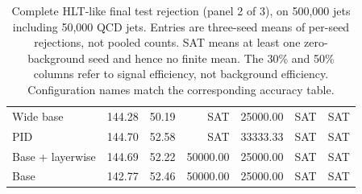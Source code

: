 \begin{table}[htbp]
\begin{tabularx}{\linewidth}{@{}Xrrrrrr@{}}
Wide base & 144.28 & 50.19 & SAT & 25000.00 & SAT & SAT \\ %
PID & 144.70 & 52.58 & SAT & 33333.33 & SAT & SAT \\ %
Base + layerwise & 144.69 & 52.22 & 50000.00 & 25000.00 & SAT & SAT \\ %
Base & 142.77 & 52.46 & 50000.00 & 25000.00 & SAT & SAT \\ %
\bottomrule
\end{tabularx}
\caption{Complete HLT-like final test rejection (panel 2 of 3),
on 500,000 jets including 50,000 QCD jets. Entries are three-seed means of per-seed rejections, not pooled counts.
SAT means at least one zero-background seed and hence no finite mean.
The 30\% and 50\% columns refer to signal efficiency, not background
efficiency. Configuration names match the corresponding accuracy table.}
\label{tab:hlt-hlt-rejection-2}
\end{table}
